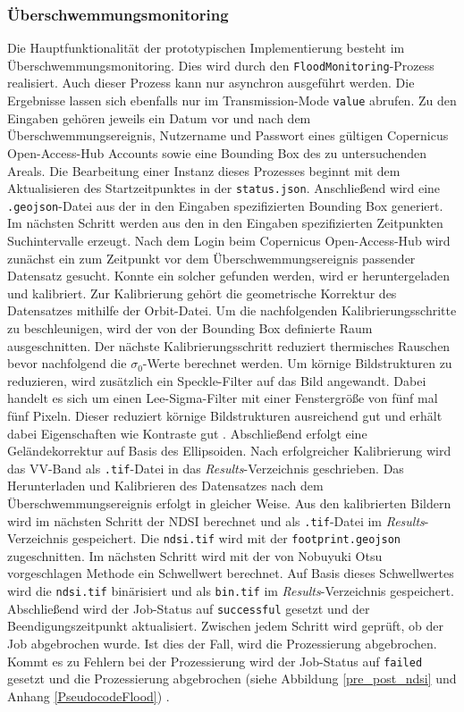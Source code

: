 \subsubsection{Überschwemmungsmonitoring}
Die Hauptfunktionalität der prototypischen Implementierung besteht im Überschwemmungsmonitoring. Dies wird durch den \verb|FloodMonitoring|-Prozess realisiert. 
Auch dieser Prozess kann nur asynchron ausgeführt werden. Die Ergebnisse lassen sich ebenfalls nur im Transmission-Mode \verb|value| abrufen.  
Zu den Eingaben gehören jeweils ein Datum vor und nach dem Überschwemmungsereignis, Nutzername und Passwort eines gültigen Copernicus Open-Access-Hub Accounts sowie 
eine Bounding Box des zu untersuchenden Areals.
Die Bearbeitung einer Instanz dieses Prozesses beginnt mit dem Aktualisieren des Startzeitpunktes in der \verb|status.json|. Anschließend wird eine \verb|.geojson|-Datei 
aus der in den Eingaben spezifizierten Bounding Box generiert. 
Im nächsten Schritt werden aus den in den Eingaben spezifizierten Zeitpunkten Suchintervalle erzeugt. Nach dem Login beim Copernicus Open-Access-Hub wird zunächst ein 
zum Zeitpunkt vor dem Überschwemmungsereignis passender Datensatz gesucht. Konnte ein solcher gefunden werden, wird er heruntergeladen und kalibriert. 
Zur Kalibrierung gehört die geometrische Korrektur des Datensatzes mithilfe der Orbit-Datei. Um die nachfolgenden Kalibrierungsschritte zu beschleunigen, 
wird der von der Bounding Box definierte Raum ausgeschnitten. Der nächste Kalibrierungsschritt reduziert thermisches Rauschen bevor nachfolgend 
die $\sigma_0$-Werte berechnet werden. Um körnige Bildstrukturen zu reduzieren, wird 
zusätzlich ein Speckle-Filter auf das Bild angewandt. Dabei handelt es sich um einen Lee-Sigma-Filter mit einer Fenstergröße von fünf mal fünf Pixeln. 
Dieser reduziert körnige Bildstrukturen ausreichend gut und erhält dabei Eigenschaften wie Kontraste gut \cite{speckle_filtering}. Abschließend erfolgt eine 
Geländekorrektur auf Basis des Ellipsoiden. Nach erfolgreicher Kalibrierung wird das VV-Band als \verb|.tif|-Datei in das \emph{Results}-Verzeichnis geschrieben. 
Das Herunterladen und Kalibrieren des Datensatzes nach dem Überschwemmungsereignis erfolgt in gleicher Weise. Aus den kalibrierten Bildern wird im nächsten Schritt der NDSI 
berechnet und als \verb|.tif|-Datei im \emph{Results}-Verzeichnis gespeichert. Die \verb|ndsi.tif| wird mit der \verb|footprint.geojson| zugeschnitten. 
Im nächsten Schritt wird mit der von Nobuyuki Otsu vorgeschlagen Methode ein Schwellwert berechnet. Auf Basis dieses Schwellwertes wird die \verb|ndsi.tif| 
binärisiert und als \verb|bin.tif| im \emph{Results}-Verzeichnis gespeichert. 
Abschließend wird der Job-Status auf \verb|successful| gesetzt und der Beendigungszeitpunkt aktualisiert. 
Zwischen jedem Schritt wird geprüft, ob der Job abgebrochen wurde. Ist dies der Fall, wird die Prozessierung abgebrochen. 
Kommt es zu Fehlern bei der Prozessierung wird der Job-Status auf \verb|failed| gesetzt und die Prozessierung abgebrochen (siehe Abbildung \ref{pre_post_ndsi} und Anhang \ref{PseudocodeFlood}) \cite{code}.

